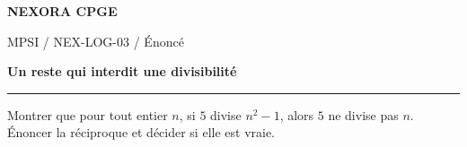 \documentclass[11pt,a4paper]{article}
\begin{document}
{\small\bfseries\color{nexorablue} NEXORA CPGE}\par
{\small MPSI / NEX-LOG-03 / Énoncé}\par
{\LARGE\bfseries Un reste qui interdit une divisibilité}\par
\vspace{0.25em}\hrule\vspace{0.6em}

Montrer que pour tout entier $n$, si $5$ divise $n^2-1$, alors $5$ ne divise pas $n$. Énoncer la réciproque et décider si elle est vraie.
\end{document}
